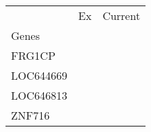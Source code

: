 \begin{tabular}{lcc}
\toprule
{} & Ex & Current \\
Genes     &    &         \\
\midrule
FRG1CP    &    &         \\
LOC644669 &    &         \\
LOC646813 &    &         \\
ZNF716    &    &         \\
\bottomrule
\end{tabular}
